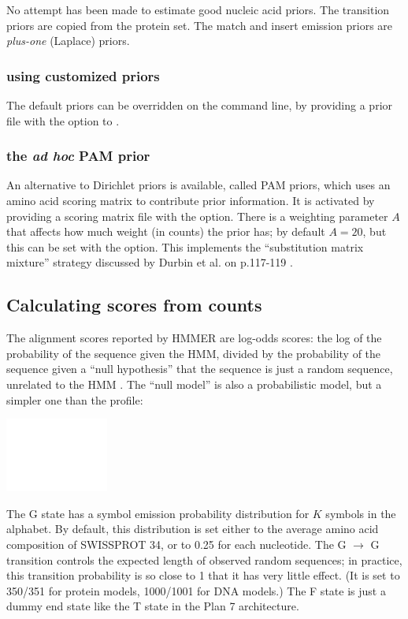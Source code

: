 No attempt has been made to estimate good nucleic acid priors.  The
transition priors are copied from the protein set. The match and
insert emission priors are \emph{plus-one} (Laplace) priors.

\subsubsection{using customized priors}

The default priors can be overridden on the command line, by providing
a prior file with the  option to .

\subsubsection{the \emph{ad hoc} PAM prior}

An alternative to Dirichlet priors is available, called PAM priors,
which uses an amino acid scoring matrix to contribute prior
information.  It is activated by providing a scoring matrix file with
the  option. There is a weighting parameter $A$ that
affects how much weight (in counts) the prior has; by default $A=20$,
but this can be set with the  option. This
implements the ``substitution matrix mixture'' strategy discussed by
Durbin et al. on p.117-119 \cite{Durbin98}.

\subsection{Calculating scores from counts}

The alignment scores reported by HMMER are log-odds scores: the log of
the probability of the sequence given the HMM, divided by the
probability of the sequence given a ``null hypothesis'' that the
sequence is just a random sequence, unrelated to the HMM
\cite{Barrett97}. The ``null model'' is also a probabilistic model,
but a simpler one than the profile:

\begin{center}
\includegraphics{nullmodel}
\end{center}

The G state has a symbol emission probability distribution for $K$
symbols in the alphabet. By default, this distribution is set either
to the average amino acid composition of SWISSPROT 34, or to 0.25 for
each nucleotide. The G $\rightarrow$ G transition controls the
expected length of observed random sequences; in practice, this
transition probability is so close to 1 that it has very little
effect. (It is set to 350/351 for protein models, 1000/1001 for DNA
models.) The F state is just a dummy end state like the T state in the
Plan 7 architecture.


